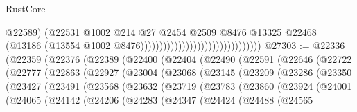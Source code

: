 \begin{lexlean}{RustCore}
\begin{coremodule}
                                                                @22589)
                                                              (@22531
                                                                @1002
                                                                @214
                                                                @27
                                                                @2454
                                                                @2509
                                                                @8476
                                                                @13325
                                                                @22468
                                                                (@13186
                                                                  (@13554
                                                                    @1002
                                                                    @8476))))))))))))))))))))))))))))))))
@27303 := @22336
    (@22359
      (@22376
        (@22389
          (@22400
            (@22404
              (@22490
                (@22591
                  (@22646
                    (@22722
                      (@22777
                        (@22863
                          (@22927
                            (@23004
                              (@23068
                                (@23145
                                  (@23209
                                    (@23286
                                      (@23350
                                        (@23427
                                          (@23491
                                            (@23568
                                              (@23632
                                                (@23719
                                                  (@23783
                                                    (@23860
                                                      (@23924
                                                        (@24001
                                                          (@24065
                                                            (@24142
                                                              (@24206
                                                                (@24283
                                                                  (@24347
                                                                    (@24424
                                                                      (@24488
                                                                        (@24565

\end{coremodule}
\end{lexlean}
